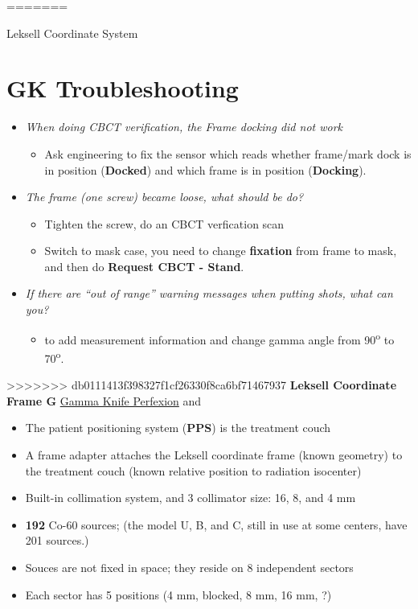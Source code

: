 \documentclass[]{book}
\providecommand{\tightlist}{%
  \setlength{\itemsep}{0pt}\setlength{\parskip}{0pt}}
\theoremstyle{definition}
\theoremstyle{definition}
\theoremstyle{definition}
\theoremstyle{remark}
\begin{document}
=======

Leksell Coordinate System

\section{GK Troubleshooting}\label{gk-troubleshooting}

\begin{itemize}
\tightlist
\item
  \emph{When doing CBCT verification, the Frame docking did not work}

  \begin{itemize}
  \tightlist
  \item
    Ask engineering to fix the sensor which reads whether frame/mark
    dock is in position (\textbf{Docked}) and which frame is in position
    (\textbf{Docking}).
  \end{itemize}
\item
  \emph{The frame (one screw) became loose, what should be do?}

  \begin{itemize}
  \tightlist
  \item
    Tighten the screw, do an CBCT verfication scan
  \item
    Switch to mask case, you need to change \textbf{fixation} from frame
    to mask, and then do \textbf{Request CBCT - Stand}.
  \end{itemize}
\item
  \emph{If there are ``out of range'' warning messages when putting
  shots, what can you?}

  \begin{itemize}
  \tightlist
  \item
    to add measurement information and change gamma angle from
    90\textsuperscript{o} to 70\textsuperscript{o}.
  \end{itemize}
\end{itemize}

>>>>>>> db0111413f398327f1cf26330f8ca6bf71467937
\textbf{Leksell Coordinate Frame G}
\href{https://www.youtube.com/watch?v=90vD3cxc9m0}{Gamma Knife
Perfexion} and

\begin{itemize}
\tightlist
\item
  The patient positioning system (\textbf{PPS}) is the treatment couch
\item
  A frame adapter attaches the Leksell coordinate frame (known geometry)
  to the treatment couch (known relative position to radiation
  isocenter)
\item
  Built-in collimation system, and 3 collimator size: 16, 8, and 4 mm
\item
  \textbf{192} Co-60 sources; (the model U, B, and C, still in use at
  some centers, have 201 sources.)
\item
  Souces are not fixed in space; they reside on 8 independent sectors
\item
  Each sector has 5 positions (4 mm, blocked, 8 mm, 16 mm, ?)
\end{itemize}
\end{document}
